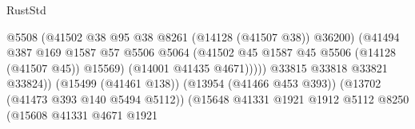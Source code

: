 \begin{lexlean}{RustStd}
\begin{coremodule}
                                                          @5508
                                                          (@41502
                                                            @38
                                                            @95
                                                            @38
                                                            @8261
                                                            (@14128 (@41507 @38))
                                                            @36200)
                                                          (@41494
                                                            @387
                                                            @169
                                                            @1587
                                                            @57
                                                            @5506
                                                            @5064
                                                            (@41502
                                                              @45
                                                              @1587
                                                              @45
                                                              @5506
                                                              (@14128 (@41507 @45))
                                                              @15569)
                                                            (@14001 @41435 @4671)))))
                                                    @33815
                                                    @33818
                                                    @33821
                                                    @33824))
                                                (@15499 (@41461 @138))
                                                (@13954 (@41466 @453 @393))
                                                (@13702 (@41473 @393 @140 @5494 @5112))
                                                (@15648
                                                  @41331
                                                  @1921
                                                  @1912
                                                  @5112
                                                  @8250
                                                  (@15608
                                                    @41331
                                                    @4671
                                                    @1921

\end{coremodule}
\end{lexlean}
